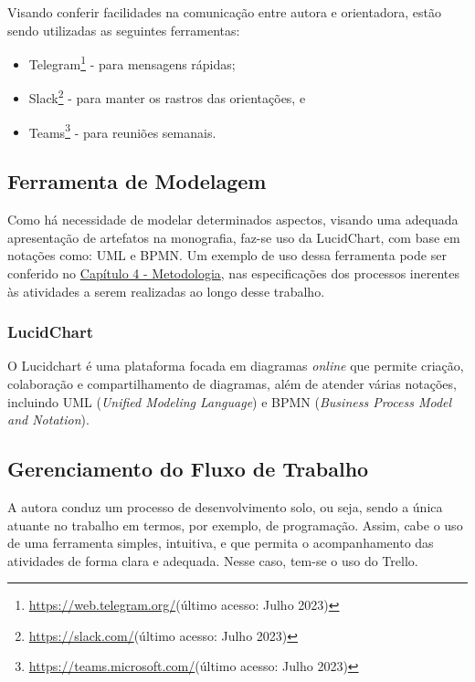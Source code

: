 \begin{description}
    \item Visando conferir facilidades na comunicação entre autora e orientadora, estão sendo utilizadas as seguintes ferramentas:
          \begin{itemize}
              \item Telegram\footnote{\url{https://web.telegram.org/}(último acesso: Julho 2023)} - para mensagens rápidas;

              \item Slack\footnote{\url{https://slack.com/}(último acesso: Julho 2023)} - para manter os rastros das orientações, e

              \item Teams\footnote{\url{https://teams.microsoft.com/}(último acesso: Julho 2023)} - para reuniões semanais.
          \end{itemize}
\end{description}

\subsection{Ferramenta de Modelagem}
\label{sec:Ferramenta de Modelagem}
Como há necessidade de modelar determinados aspectos, visando uma adequada apresentação de artefatos na monografia, faz-se uso da LucidChart, com base em notações como: UML e BPMN. Um exemplo de 
uso dessa ferramenta pode ser conferido no \hyperref[chap:Metodologia]{Capítulo 4 - Metodologia}, nas especificações dos processos inerentes às atividades a serem realizadas ao longo desse trabalho.

\subsubsection{LucidChart}
\label{sec:LucidChart}
O Lucidchart \cite{lucidchart} é uma plataforma focada em diagramas \textit{online} que permite criação, colaboração e compartilhamento de diagramas, além de atender várias notações, incluindo UML (\textit{Unified Modeling Language}) 
e BPMN (\textit{Business Process Model and Notation}).

\subsection{Gerenciamento do Fluxo de Trabalho}
\label{sec:Gerenciamento do Fluxo de Trabalho}
A autora conduz um processo de desenvolvimento solo, ou seja, sendo a única atuante no trabalho em termos, por exemplo, de programação. Assim, cabe o uso de uma ferramenta simples, intuitiva, e que 
permita o acompanhamento das atividades de forma clara e adequada. Nesse caso, tem-se o uso do Trello.

